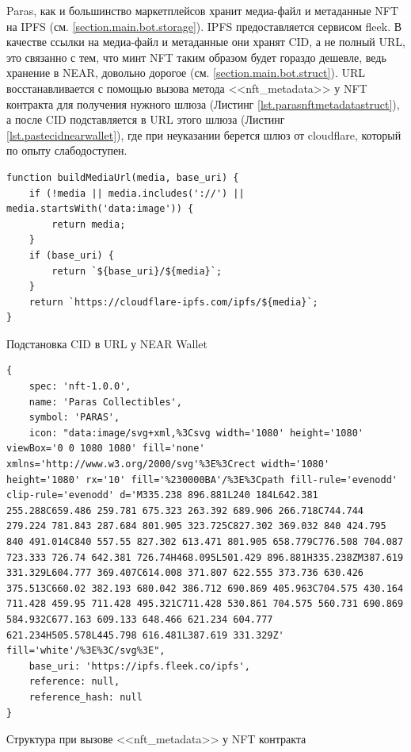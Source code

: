 Paras, как и большинство маркетплейсов хранит медиа-файл и метаданные NFT на IPFS\cite{ipfs} (см. {\color{blue} \ref{section.main.bot.storage}}). IPFS предоставляется сервисом fleek\cite{fleek}. В качестве ссылки на медиа-файл и метаданные они хранят CID, а не полный URL, это связанно с тем, что минт NFT таким образом будет гораздо дешевле, ведь хранение в NEAR, довольно дорогое (см. {\color{blue} \ref{section.main.bot.struct}}). URL восстанавливается с помощью вызова метода <<nft\_metadata>> у NFT контракта для получения нужного шлюза (Листинг {\color{blue}\ref{lst.parasnftmetadatastruct}}), а после CID подставляется в URL этого шлюза (Листинг {\color{blue}\ref{lst.pastecidnearwallet}}), где при неуказании берется шлюз от cloudflare, который по опыту слабодоступен.

\begin{listing}
\begin{verbatim}
function buildMediaUrl(media, base_uri) {
    if (!media || media.includes('://') || media.startsWith('data:image')) {
        return media;
    }
    if (base_uri) {
        return `${base_uri}/${media}`;
    }
    return `https://cloudflare-ipfs.com/ipfs/${media}`;
}
\end{verbatim}
\caption{Подстановка CID в URL у NEAR Wallet\cite{pastecidnearwallet}}
\label{lst.pastecidnearwallet}
\end{listing}

\begin{listing}
\begin{verbatim}
{
    spec: 'nft-1.0.0',
    name: 'Paras Collectibles',
    symbol: 'PARAS',
    icon: "data:image/svg+xml,%3Csvg width='1080' height='1080' viewBox='0 0 1080 1080' fill='none' xmlns='http://www.w3.org/2000/svg'%3E%3Crect width='1080' height='1080' rx='10' fill='%230000BA'/%3E%3Cpath fill-rule='evenodd' clip-rule='evenodd' d='M335.238 896.881L240 184L642.381 255.288C659.486 259.781 675.323 263.392 689.906 266.718C744.744 279.224 781.843 287.684 801.905 323.725C827.302 369.032 840 424.795 840 491.014C840 557.55 827.302 613.471 801.905 658.779C776.508 704.087 723.333 726.74 642.381 726.74H468.095L501.429 896.881H335.238ZM387.619 331.329L604.777 369.407C614.008 371.807 622.555 373.736 630.426 375.513C660.02 382.193 680.042 386.712 690.869 405.963C704.575 430.164 711.428 459.95 711.428 495.321C711.428 530.861 704.575 560.731 690.869 584.932C677.163 609.133 648.466 621.234 604.777 621.234H505.578L445.798 616.481L387.619 331.329Z' fill='white'/%3E%3C/svg%3E",
    base_uri: 'https://ipfs.fleek.co/ipfs',
    reference: null,
    reference_hash: null
}
\end{verbatim}
\caption{Структура при вызове <<nft\_metadata>> у NFT контракта}
\label{lst.parasfunctioncallnftmetadata}
\end{listing}

